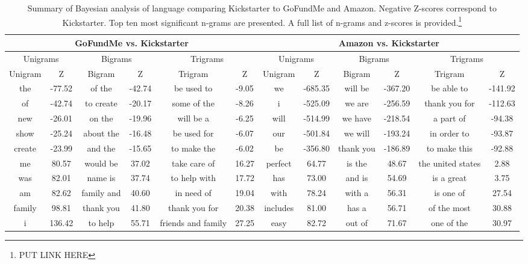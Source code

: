 \documentclass[letterpaper]{article}
\begin{document}
\begin{table}[t]
\centering
\scriptsize
\begin{tabular}{|*{12}{c|}}  %
\hline
\multicolumn{6}{|c}{GoFundMe vs. Kickstarter} & \multicolumn{6}{|c|}{Amazon vs. Kickstarter} \\ \hline
\multicolumn{2}{|c}{Unigrams} & \multicolumn{2}{|c}{Bigrams} & \multicolumn{2}{|c}{Trigrams} & 
\multicolumn{2}{|c}{Unigrams} & \multicolumn{2}{|c}{Bigrams} & \multicolumn{2}{|c|}{Trigrams} \\ \hline 
Unigram & Z & Bigram & Z & Trigram & Z & Unigram & Z & Bigram & Z & Trigram & Z \\ \hline
the & -77.52 & of the & -42.74 & be used to & -9.05 &
we & -685.35 & will be & -367.20 & be able to & -141.92 \\\hline
of & -42.74 & to create & -20.17 & some of the & -8.26 &
i & -525.09 & we are & -256.59 & thank you for & -112.63 \\\hline
new & -26.01 & on the & -19.96 & will be a & -6.25 &
will & -514.99 & we have & -218.54 & a part of & -94.38 \\\hline
show & -25.24 & about the & -16.48 & be used for & -6.07 &
our & -501.84 & we will & -193.24 & in order to & -93.87 \\\hline
create & -23.99 & and the & -15.65 & to make the & -6.02 &
be & -356.80 & thank you & -186.89 & to make this & -92.88 \\\hline \hline

me & 80.57 & would be & 37.02 & take care of & 16.27 &
perfect & 64.77 & is the & 48.67 & the united states & 2.88 \\\hline
was & 82.01 & name is & 37.74 & to help with & 17.72 &
has & 73.00 & and is & 54.69 & is a great & 3.75\\\hline
am & 82.62 & family and & 40.60 & in need of & 19.04 &
with & 78.24 & with a & 56.31 & is one of & 27.54\\\hline
family & 98.81 & thank you & 41.80 & thank you for & 20.38 &
includes & 81.00 & has a & 56.71 & of the most & 30.88\\\hline
i & 136.42 & to help & 55.71 & friends and family & 27.25 &
easy & 82.72 & out of & 71.67 & one of the & 30.97 \\\hline
\end{tabular}
\caption{Summary of Bayesian analysis of language comparing Kickstarter to GoFundMe and Amazon. Negative Z-scores correspond to Kickstarter. Top ten most significant n-grams are presented. A full list of n-grams and z-scores is provided.\footnote{PUT LINK HERE}}
\label{tab:pairwise}
\end{table}
\end{document}
